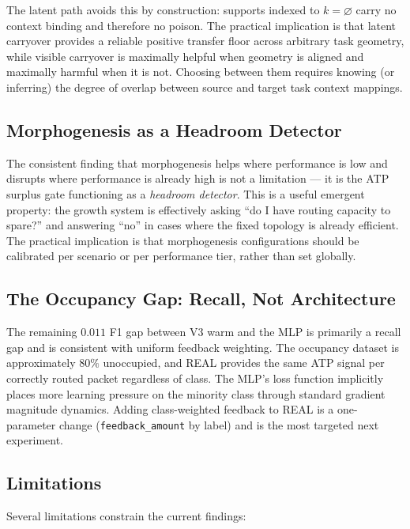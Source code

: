 \documentclass[10pt,twocolumn]{article}
\begin{document}
The latent path avoids this by construction: supports indexed to
$k = \varnothing$ carry no context binding and therefore no poison.
The practical implication is that latent carryover provides a reliable positive
transfer floor across arbitrary task geometry, while visible carryover is
maximally helpful when geometry is aligned and maximally harmful when it is not.
Choosing between them requires knowing (or inferring) the degree of overlap
between source and target task context mappings.

\subsection{Morphogenesis as a Headroom Detector}

The consistent finding that morphogenesis helps where performance is low
and disrupts where performance is already high is not a limitation --- it is
the ATP surplus gate functioning as a \emph{headroom detector}.
This is a useful emergent property: the growth system is effectively asking
``do I have routing capacity to spare?'' and answering ``no'' in cases where
the fixed topology is already efficient.
The practical implication is that morphogenesis configurations should be
calibrated per scenario or per performance tier, rather than set globally.

\subsection{The Occupancy Gap: Recall, Not Architecture}

The remaining $0.011$ F1 gap between V3 warm and the MLP is primarily a recall
gap and is consistent with uniform feedback weighting.
The occupancy dataset is approximately $80\%$ unoccupied, and REAL provides
the same ATP signal per correctly routed packet regardless of class.
The MLP's loss function implicitly places more learning pressure on the
minority class through standard gradient magnitude dynamics.
Adding class-weighted feedback to REAL is a one-parameter change
(\texttt{feedback\_amount} by label) and is the most targeted next experiment.

\subsection{Limitations}

Several limitations constrain the current findings:
\end{document}
